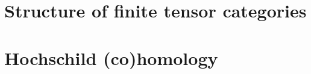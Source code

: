         \begin{appendices}
            \chapter{Structure of finite tensor categories}
                \begin{abstract}
                
                \end{abstract}
                
                \minitoc
            
                
                
                
    
            \chapter{Hochschild (co)homology}
                \begin{abstract}
                
                \end{abstract}
                
                \minitoc
                
        \end{appendices}
	
    \printbibliography

